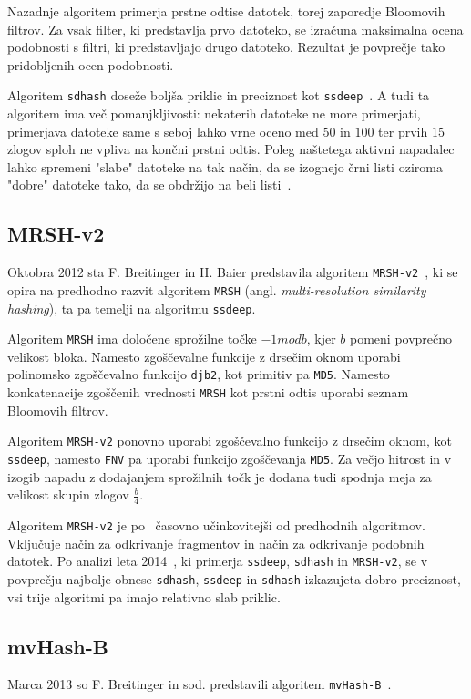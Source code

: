 \documentclass{acm_proc_article-sp}
\begin{document}
Nazadnje algoritem primerja prstne odtise datotek, torej zaporedje Bloomovih filtrov. Za vsak filter, ki predstavlja prvo datoteko, se izračuna maksimalna ocena podobnosti s filtri, ki predstavljajo drugo datoteko. Rezultat je povprečje tako pridobljenih ocen podobnosti.

Algoritem \texttt{sdhash} doseže boljša priklic in preciznost kot \texttt{ssdeep}~\cite{fbhash}. A tudi ta algoritem ima več pomanjkljivosti: nekaterih datoteke ne more primerjati, primerjava datoteke same s seboj lahko vrne oceno med $50$ in $100$ ter prvih $15$ zlogov sploh ne vpliva na končni prstni odtis. Poleg naštetega aktivni napadalec lahko spremeni "slabe" datoteke na tak način, da se izognejo črni listi oziroma "dobre" datoteke tako, da se obdržijo na beli listi~\cite{breitinge2012security}.

\subsection{MRSH-v2}
Oktobra 2012 sta F. Breitinger in H. Baier predstavila algoritem \texttt{MRSH-v2}~\cite{mrsh-v2}, ki se opira na predhodno razvit algoritem \texttt{MRSH} (angl. \emph{multi-resolution similarity hashing}), ta pa temelji na algoritmu \texttt{ssdeep}. 

Algoritem \texttt{MRSH} ima določene sprožilne točke $-1 mod b$, kjer $b$ pomeni povprečno velikost bloka. Namesto zgoščevalne funkcije z drsečim oknom uporabi polinomsko zgoščevalno funkcijo \texttt{djb2}, kot primitiv pa \texttt{MD5}. Namesto konkatenacije zgoščenih vrednosti \texttt{MRSH} kot prstni odtis uporabi seznam Bloomovih filtrov. 

Algoritem \texttt{MRSH-v2} ponovno uporabi zgoščevalno funkcijo z drsečim oknom, kot \texttt{ssdeep}, namesto \texttt{FNV} pa uporabi funkcijo zgoščevanja \texttt{MD5}. Za večjo hitrost in v izogib napadu z dodajanjem sprožilnih točk je dodana tudi spodnja meja za velikost skupin zlogov $\frac{b}{4}$. 

Algoritem \texttt{MRSH-v2} je po~\cite{mrsh-v2} časovno učinkovitejši od predhodnih algoritmov. Vključuje način za odkrivanje fragmentov in način za odkrivanje podobnih datotek. Po analizi leta 2014~\cite{breitinger2014}, ki primerja \texttt{ssdeep}, \texttt{sdhash} in \texttt{MRSH-v2}, se v povprečju najbolje obnese \texttt{sdhash}, \texttt{ssdeep} in \texttt{sdhash} izkazujeta dobro preciznost, vsi trije algoritmi pa imajo relativno slab priklic.

\subsection{mvHash-B}
Marca 2013 so F. Breitinger in sod. predstavili algoritem \texttt{mvHash-B}~\cite{mvhash-b}.
\end{document}
